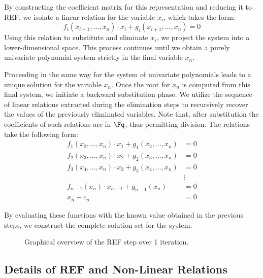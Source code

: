 By constructing the coefficient matrix for this representation and reducing it to REF, we isolate a linear relation for the variable $x_i$, which takes the form:
\begin{equation}
    f_i(x_{i+1}, \dots, x_n)\cdot x_i + g_i(x_{i+1}, \dots, x_n) = 0
    \label{eq:linear_relation_i}
\end{equation}
Using this relation to substitute and eliminate $x_i$, we project the system into a lower-dimensional space. This process continues until we obtain a purely univariate polynomial system strictly in the final variable $x_n$.

Proceeding in the same way for the system of univariate polynomials leads to a unique solution for the variable \(x_n\).
Once the root for $x_n$ is computed from this final system, we initiate a backward substitution phase. We utilize the sequence of linear relations extracted during the elimination steps to recursively recover the values of the previously eliminated variables. Note that, after substitution the coefficients of such relations are in \(\Fq\), thus permitting division. The relations take the following form:
\begin{align*}
    f_1(x_2, \dots, x_n)\cdot x_1 + g_1(x_2, \dots, x_n) &= 0 \\
    f_2(x_3, \dots, x_n)\cdot x_2 + g_2(x_3, \dots, x_n) &= 0 \\
    f_3(x_4, \dots, x_n)\cdot x_3 + g_3(x_4, \dots, x_n) &= 0 \\
    &\vdots \nonumber \\
    f_{n-1}(x_n)\cdot x_{n-1} + g_{n-1}(x_n) &= 0 \\
    x_n + c_n &= 0
    \label{eq:backward_substitution}
\end{align*}

By evaluating these functions with the known value obtained in the previous steps, we construct the complete solution set for the system.

\begin{figure}[h!]
    \centering
    \resizebox{0.8\linewidth}{!}{
        
    }
    \caption{Graphical overview of the REF step over 1 iteration.}\label{fig:overview}
\end{figure}

\subsection{Details of REF and Non-Linear Relations}

